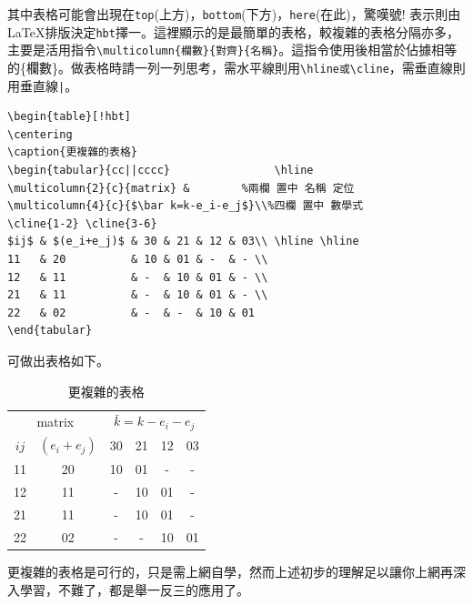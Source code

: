 \label{bookstruc1} 
其中表格可能會出現在{\tt top}(上方)，{\tt bottom}(下方)，{\tt here}(在此)，驚嘆號$!$ 表示則由\LaTeX{}排版決定{\tt hbt}擇一。這裡顯示的是最簡單的表格，較複雜的表格分隔亦多，主要是活用指令\verb|\multicolumn{欄數}{對齊}{名稱}|。這指令使用後相當於佔據相等的\{欄數\}。做表格時請一列一列思考，需水平線則用\verb|\hline或\cline|，需垂直線則用垂直線\verb+|+。

\begin{Verbatim}[frame=single,firstline=1,label=A bit complicated tabular]
\begin{table}[!hbt]
\centering
\caption{更複雜的表格}
\begin{tabular}{cc||cccc}                \hline
\multicolumn{2}{c}{matrix} &        %兩欄 置中 名稱 定位
\multicolumn{4}{c}{$\bar k=k-e_i-e_j$}\\%四欄 置中 數學式
\cline{1-2} \cline{3-6}
$ij$ & $(e_i+e_j)$ & 30 & 21 & 12 & 03\\ \hline \hline
11   & 20          & 10 & 01 & -  & - \\ 
12   & 11          & -  & 10 & 01 & - \\  
21   & 11          & -  & 10 & 01 & - \\  
22   & 02          & -  & -  & 10 & 01    
\end{tabular}
\end{Verbatim}
可做出表格如下。
\begin{table}[!hbt]
\centering
\caption{更複雜的表格}
\begin{tabular}{cc||cccc}                \hline
\multicolumn{2}{c}{matrix} & 
\multicolumn{4}{c}{$\bar k=k-e_i-e_j$}\\ 
\cline{1-2} \cline{3-6}
$ij$ & $(e_i+e_j)$ & 30 & 21 & 12 & 03\\ \hline \hline
11   & 20          & 10 & 01 & -  & - \\ 
12   & 11          & -  & 10 & 01 & - \\  
21   & 11          & -  & 10 & 01 & - \\  
22   & 02          & -  & -  & 10 & 01  
\end{tabular}
\end{table}
更複雜的表格是可行的，只是需上網自學，然而上述初步的理解足以讓你上網再深入學習，不難了，都是舉一反三的應用了。



